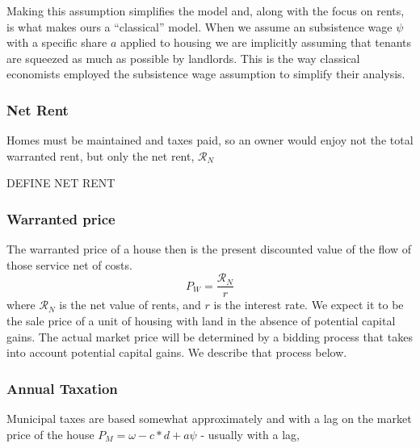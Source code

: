 Making this assumption simplifies the model and, along with the focus on rents, is what makes ours a ``classical'' model.  When we assume an subsistence wage $\psi$ with a specific share $a$ applied to housing we are implicitly assuming that tenants are squeezed as much as possible by landlords. This is the way classical economists employed the subsistence wage assumption to simplify their analysis. 




\subsubsection{Net Rent}

Homes must be maintained and taxes paid, so an owner would enjoy not the total warranted rent, but only the net rent,  $\mathcal{R}_N$

DEFINE NET RENT


\subsubsection{Warranted price}

The \gls{warranted price} of a house then is the present discounted value of the flow of those service net of costs.
\begin{equation}
  P_W=\frac{\mathcal{R}_N}{r}  
\label{eq:Capitalization}
\end{equation}
where $\mathcal{R}_N$ is the net value of rents, and $r$ is the  interest rate.
We expect it to be the sale price of a unit of housing with land in the absence of potential capital gains. The actual market price will be determined by a bidding process that takes into account potential capital gains.  We describe that process below.

\subsubsection{Annual Taxation}
Municipal taxes are based somewhat approximately and with a  lag on the market price of the house $P_M=\omega- {c} * d + a\psi$ - usually with a lag, 

